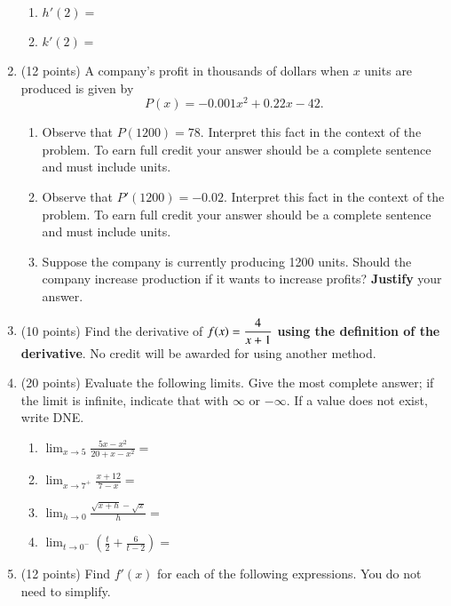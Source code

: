\documentclass[12pt]{article}
\begin{document}
\begin{enumerate}
	\begin{enumerate}

	\item $h'(2)=$\\ \vfill

	\item $k'(2)=$\\ \vfill 

	\end{enumerate}

\item (12 points) A company's profit in thousands of dollars when $x$ units are produced is given by $$P(x)=-0.001x^2+0.22x-42.$$

	\begin{enumerate}

	\item Observe that $P(1200) = 78$. Interpret this fact in the context of the problem. To earn full credit your answer should be a complete sentence and must include units.

	\vspace{1in}

	\item Observe that $P'(1200) = -0.02$. Interpret this fact in the context of the problem. To earn full credit your answer should be a complete sentence and must include units.

	\vspace{1in}

	\item Suppose the company is currently producing 1200 units. Should the company increase production if it wants to increase profits? \textbf{Justify} your answer.
\vfill
	\end{enumerate}
\newpage

\item (10 points) Find the derivative of $f(x)=\large{\displaystyle{\frac{4}{x+1}}}$ \textbf{using the definition of the derivative}. No credit will be awarded for using another method.
\newpage
\item (20 points) Evaluate the following limits. Give the most complete answer; if the limit is infinite, indicate that with $\infty$ or $-\infty.$ If a value does not exist, write DNE.\\
	\begin{enumerate}
	\item $\displaystyle{\lim_{x  \to 5} \frac{5x-x^2}{20+x-x^2}=}$
	\vfill
	\item $\displaystyle{\lim_{x \to 7^+ }  \frac{x+12}{7-x}=}$
	\vfill
	\item $\displaystyle{\lim_{h \to 0 } \frac{\sqrt{x+h} -\sqrt{x}}{h} =}$
	\vfill
	\item $\displaystyle{\lim_{t \to 0^-} \left(\frac{t}{2} + \frac{6}{t-2} \right)=}$
	\vfill
	\end{enumerate}
\newpage
\item (12 points) Find $f'(x)$ for each of the following expressions. You do not need to simplify.


\end{enumerate}
\end{document}
